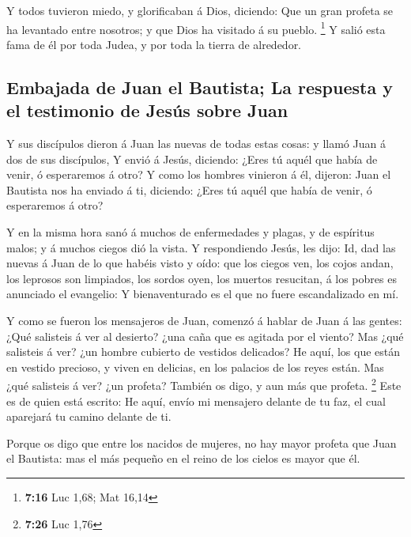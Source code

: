  Y todos tuvieron miedo, y glorificaban á Dios, diciendo:
Que un gran profeta se ha levantado entre nosotros; y que Dios ha
visitado á su pueblo. \footnote{\textbf{7:16} Luc 1,68; Mat 16,14}
 Y salió esta fama de él por toda Judea, y por toda la
tierra de alrededor.

\hypertarget{embajada-de-juan-el-bautista-la-respuesta-y-el-testimonio-de-jesuxfas-sobre-juan}{%
\subsection{Embajada de Juan el Bautista; La respuesta y el testimonio
de Jesús sobre
Juan}\label{embajada-de-juan-el-bautista-la-respuesta-y-el-testimonio-de-jesuxfas-sobre-juan}}

 Y sus discípulos dieron á Juan las nuevas de todas estas
cosas: y llamó Juan á dos de sus discípulos,  Y envió á
Jesús, diciendo: ¿Eres tú aquél que había de venir, ó esperaremos á
otro?  Y como los hombres vinieron á él, dijeron: Juan el
Bautista nos ha enviado á ti, diciendo: ¿Eres tú aquél que había de
venir, ó esperaremos á otro?

 Y en la misma hora sanó á muchos de enfermedades y
plagas, y de espíritus malos; y á muchos ciegos dió la vista.
 Y respondiendo Jesús, les dijo: Id, dad las nuevas á
Juan de lo que habéis visto y oído: que los ciegos ven, los cojos andan,
los leprosos son limpiados, los sordos oyen, los muertos resucitan, á
los pobres es anunciado el evangelio:  Y bienaventurado
es el que no fuere escandalizado en mí.

 Y como se fueron los mensajeros de Juan, comenzó á
hablar de Juan á las gentes: ¿Qué salisteis á ver al desierto? ¿una caña
que es agitada por el viento?  Mas ¿qué salisteis á ver?
¿un hombre cubierto de vestidos delicados? He aquí, los que están en
vestido precioso, y viven en delicias, en los palacios de los reyes
están.  Mas ¿qué salisteis á ver? ¿un profeta? También os
digo, y aun más que profeta. \footnote{\textbf{7:26} Luc 1,76}
 Este es de quien está escrito: He aquí, envío mi
mensajero delante de tu faz, el cual aparejará tu camino delante de ti.

 Porque os digo que entre los nacidos de mujeres, no hay
mayor profeta que Juan el Bautista: mas el más pequeño en el reino de
los cielos es mayor que él.

